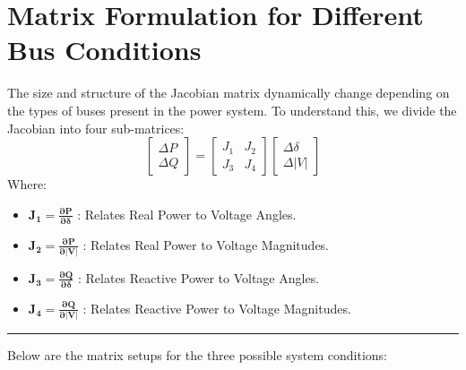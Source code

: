 \documentclass[11pt]{article}
\begin{document}
\section*{\textcolor{mainblue}{Matrix Formulation for Different Bus Conditions}}
The size and structure of the Jacobian matrix dynamically change depending on the types of buses present in the power system. To understand this, we divide the Jacobian into four sub-matrices:
\begin{equation*}
    \begin{bmatrix} \Delta P \\ \Delta Q \end{bmatrix} = 
    \begin{bmatrix} J_1 & J_2 \\ J_3 & J_4 \end{bmatrix} 
    \begin{bmatrix} \Delta \delta \\ \Delta |V| \end{bmatrix}
\end{equation*}
Where:
\begin{itemize}
    \item $\mathbf{J_1 = \frac{\partial P}{\partial \delta}}$ : Relates Real Power to Voltage Angles.
    \item $\mathbf{J_2 = \frac{\partial P}{\partial |V|}}$ : Relates Real Power to Voltage Magnitudes.
    \item $\mathbf{J_3 = \frac{\partial Q}{\partial \delta}}$ : Relates Reactive Power to Voltage Angles.
    \item $\mathbf{J_4 = \frac{\partial Q}{\partial |V|}}$ : Relates Reactive Power to Voltage Magnitudes.
\end{itemize}

\hrule
\vspace{0.2cm}
Below are the matrix setups for the three possible system conditions:
\end{document}
